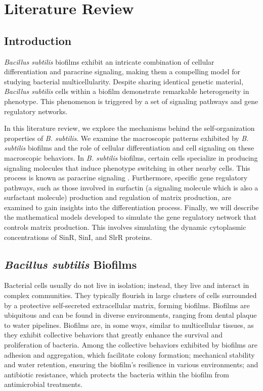 \chapter{Literature Review}\label{chap:litrev}

\section{Introduction}\label{sec:litrev:intro}

\textit{Bacillus subtilis} biofilms exhibit an intricate combination of cellular differentiation and paracrine signaling, making them a compelling model for studying bacterial multicellularity.{\footnotesize\cite{Lyons2015}\cite{Lpez2009}} Despite sharing identical genetic material, \textit{Bacillus subtilis} cells within a biofilm demonstrate remarkable heterogeneity in phenotype. This phenomenon is triggered by a set of signaling pathways and gene regulatory networks. {\footnotesize\cite{chai_vlamakis_kolter_2011}\cite{Vlamakis2008}}

In this literature review, we explore the mechanisms behind the self-organization properties of \textit{B. subtilis}. We examine the macroscopic patterns exhibited by \textit{B. subtilis} biofilms and the role of cellular differentiation and cell signaling on these macroscopic behaviors. In \textit{B. subtilis} biofilms, certain cells specialize in producing signaling molecules that induce phenotype switching in other nearby cells. This process is known as paracrine signaling {\footnotesize\cite{Lpez2009}}. Furthermore, specific gene regulatory pathways, such as those involved in surfactin (a signaling molecule which is also a surfactant molecule) production and regulation of matrix production, are examined to gain insights into the differentiation process.
Finally, we will describe the mathematical models developed to simulate the gene regulatory network that controls matrix production. This involves simulating the dynamic cytoplasmic concentrations of SinR, SinI, and SlrR proteins.

\section{\textit{Bacillus subtilis} Biofilms}\label{sec:litrev:theme1}
Bacterial cells usually do not live in isolation; instead, they live and interact in complex communities. They typically flourish in large clusters of cells surrounded by a protective self-secreted extracellular matrix, forming biofilms. Biofilms are ubiquitous and can be found in diverse environments, ranging from dental plaque to water pipelines. Biofilms are, in some ways, similar to multicellular tissues, as they exhibit collective behaviors that greatly enhance the survival and proliferation of bacteria.{\footnotesize\cite{Webb2003}\cite{Lyons2015}} Among the collective behaviors exhibited by biofilms are adhesion and aggregation, which facilitate colony formation; mechanical stability and water retention{\footnotesize\cite{Ido2020}}, ensuring the biofilm's resilience in various environments; and antibiotic resistance{\footnotesize\cite{Mah2012}}, which protects the bacteria within the biofilm from antimicrobial treatments.

